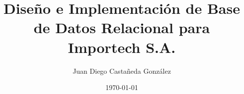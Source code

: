 

\title{Diseño e Implementación de Base de Datos Relacional para Importech S.A.}
\author{Juan Diego Castañeda González}
\date{\today} %

\newcommand{\institucion}{Servicio Nacional de Aprendizaje (SENA)}
\newcommand{\facultad}{Área de Diseño de Software}
\newcommand{\docente}{Nombre del Instructor}
\newcommand{\palabrasclave}{Sistema de información, Base de datos relacional, SQL, Importech.}
\newcommand{\resumendoc}{Informe técnico sobre el modelado DDL y DML para el control de ventas.}